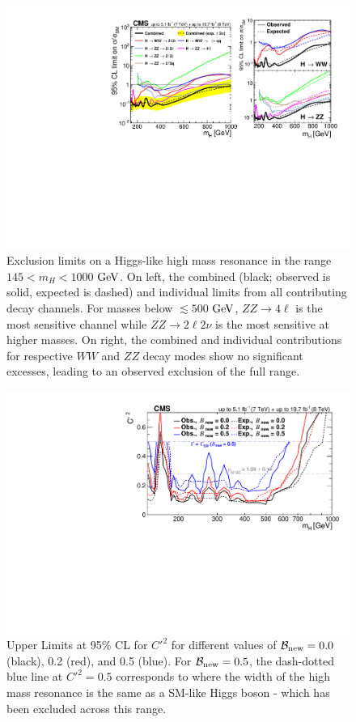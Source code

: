 \begin{figure}[htbp]
\begin{center}
\includegraphics[width=.75\linewidth]{HiggsProperties/figures/combinedSM_def.pdf}
\caption[Combined Expected and Observed Exclusion Limits for High Mass Higgs Search]{Exclusion limits on a Higgs-like high mass resonance in the range $145 < m_{H} < 1000$ $\rm{GeV}$. On left, the combined (black; observed is solid, expected is dashed) and individual limits from all contributing decay channels. For masses below $\lesssim 500$ $\rm{GeV}$, $ZZ\rightarrow 4\ell$ is the most sensitive channel while $ZZ\rightarrow 2\ell2\nu$ is the most sensitive at higher masses. On right, the combined and individual contributions for respective $WW$ and $ZZ$ decay modes show no significant excesses, leading to an observed exclusion of the full range.}
\label{fig:HMExclusion}
\end{center}
\end{figure}

\begin{figure}[htbp]
\begin{center}
\includegraphics[width=.75\linewidth]{HiggsProperties/figures/combined_BRnewContours.pdf}
\caption[Limits on $C'^2$ for Different Values of $\mathcal{B}_{\rm{new}}$ in the EW Singlet Extension to the Standard Model]{Upper Limits at 95\% CL for $C'^2$ for different values of $\mathcal{B}_{\rm{new}} = 0.0$ (black), 0.2 (red), and 0.5 (blue). For $\mathcal{B}_{\rm{new}} = 0.5$, the dash-dotted blue line at $C'^2 = 0.5$ corresponds to where the width of the high mass resonance is the same as a SM-like Higgs boson - which has been excluded across this range.}
\label{fig:EWSExclusions}
\end{center}
\end{figure}

